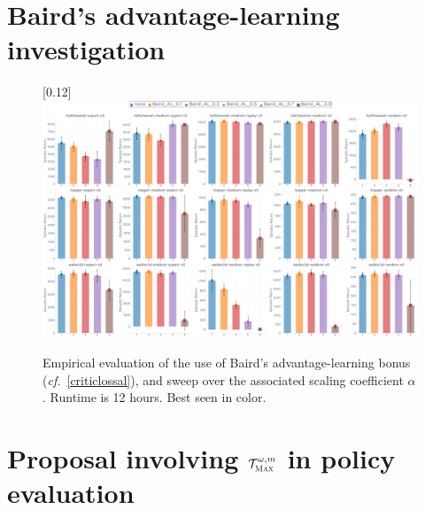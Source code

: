 

\section{Baird's advantage-learning investigation}
\label{bairdal}

\begin{figure}[H]
  \center\scalebox{0.12}[0.12]{\includegraphics{Plots/baird_al/plots_main_eval_env_ret_barplot.pdf}}
  \caption{Empirical evaluation of the use of Baird's advantage-learning bonus (\textit{cf.}~\ref{criticlossal}),
  and sweep over the associated scaling coefficient $\alpha$.
  Runtime is 12 hours. Best seen in color.}
  \label{bairdal:barplot}
\end{figure}

\section{Proposal involving $\mathcal{T}_\textsc{Max}^{\omega, m}$ in policy evaluation}
\label{tmaxops}

